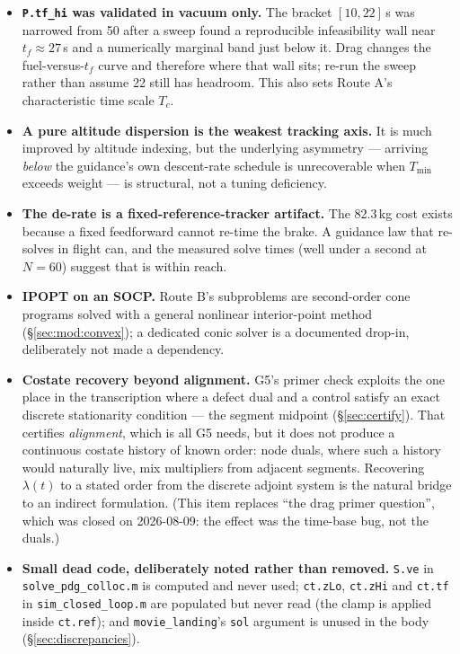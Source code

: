 \documentclass[11pt]{article}
\newcommand{\Tmin}{T_{\min}}
\newcommand{\file}[1]{\texttt{#1}}
\begin{document}
\begin{itemize}

\item \textbf{\texttt{P.tf\_hi} was validated in vacuum only.} The bracket
$[10,22]$\,s was narrowed from 50 after a sweep found a reproducible
infeasibility wall near $t_f\approx27$\,s and a numerically marginal band
just below it. Drag changes the fuel-versus-$t_f$ curve and therefore where
that wall sits; re-run the sweep rather than assume 22 still has headroom.
This also sets Route A's characteristic time scale $T_c$.

\item \textbf{A pure altitude dispersion is the weakest tracking axis.} It
is much improved by altitude indexing, but the underlying asymmetry ---
arriving \emph{below} the guidance's own descent-rate schedule is
unrecoverable when $\Tmin$ exceeds weight --- is structural, not a tuning
deficiency.

\item \textbf{The de-rate is a fixed-reference-tracker artifact.} The
82.3\,kg cost exists because a fixed feedforward cannot re-time the brake. A
guidance law that re-solves in flight can, and the measured solve times
(well under a second at $N=60$) suggest that is within reach.

\item \textbf{IPOPT on an SOCP.} Route B's subproblems are second-order
cone programs solved with a general nonlinear interior-point method
(\S\ref{sec:mod:convex}); a dedicated conic solver is a documented drop-in,
deliberately not made a dependency.

\item \textbf{Costate recovery beyond alignment.} G5's primer check exploits
the one place in the transcription where a defect dual and a control satisfy
an exact discrete stationarity condition --- the segment midpoint
(\S\ref{sec:certify}). That certifies \emph{alignment}, which is all G5
needs, but it does not produce a continuous costate history of known order:
node duals, where such a history would naturally live, mix multipliers from
adjacent segments. Recovering $\lambda(t)$ to a stated order from the
discrete adjoint system is the natural bridge to an indirect formulation.
(This item replaces ``the drag primer question'', which was closed on
2026-08-09: the effect was the time-base bug, not the duals.)

\item \textbf{Small dead code, deliberately noted rather than removed.}
\texttt{S.ve} in \file{solve\_pdg\_colloc.m} is computed and never used;
\texttt{ct.zLo}, \texttt{ct.zHi} and \texttt{ct.tf} in
\file{sim\_closed\_loop.m} are populated but never read (the clamp is
applied inside \texttt{ct.ref}); and \texttt{movie\_landing}'s \texttt{sol}
argument is unused in the body (\S\ref{sec:discrepancies}).


\end{itemize}
\end{document}

